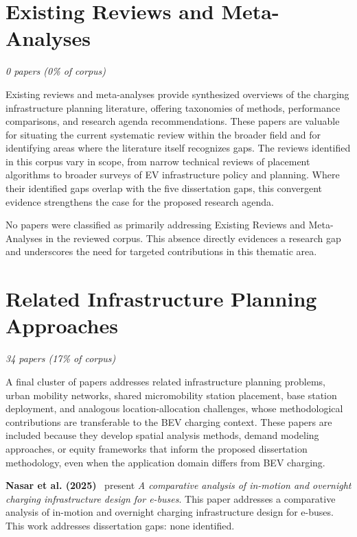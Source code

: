 \documentclass[letterpaper, 12pt, oneside, doublespacing]{Thesis}
\begin{document}
\section{Existing Reviews and Meta-Analyses}

\textit{0 papers (0\% of corpus)}

Existing reviews and meta-analyses provide synthesized overviews of the charging infrastructure planning literature, offering taxonomies of methods, performance comparisons, and research agenda recommendations. These papers are valuable for situating the current systematic review within the broader field and for identifying areas where the literature itself recognizes gaps. The reviews identified in this corpus vary in scope, from narrow technical reviews of placement algorithms to broader surveys of EV infrastructure policy and planning. Where their identified gaps overlap with the five dissertation gaps, this convergent evidence strengthens the case for the proposed research agenda.

No papers were classified as primarily addressing Existing Reviews and Meta-Analyses in the reviewed corpus. This absence directly evidences a research gap and underscores the need for targeted contributions in this thematic area.

\section{Related Infrastructure Planning Approaches}

\textit{34 papers (17\% of corpus)}

A final cluster of papers addresses related infrastructure planning problems, urban mobility networks, shared micromobility station placement, base station deployment, and analogous location-allocation challenges, whose methodological contributions are transferable to the BEV charging context. These papers are included because they develop spatial analysis methods, demand modeling approaches, or equity frameworks that inform the proposed dissertation methodology, even when the application domain differs from BEV charging.


\noindent \textbf{Nasar et al. (2025)}~\cite{a_comparative_2025} present \textit{A comparative analysis of in-motion and overnight charging infrastructure design for e-buses}. This paper addresses a comparative analysis of in-motion and overnight charging infrastructure design for e-buses. This work addresses dissertation gaps: none identified.
\end{document}
